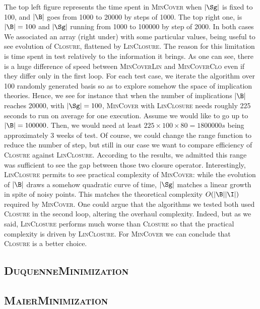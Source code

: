 The top left figure represents the time spent in \textsc{MinCover} when $|\Sg|$ is fixed to 100, and $|\B|$ goes from 1000 to 20000 by steps of 1000. The top right one, is $|\B| = 100$ and $|\Sg|$ running from 1000 to 100000 by step of 2000. In both cases We associated an array (right under) with some particular values, being useful to see evolution of \textsc{Closure}, flattened by \textsc{LinClosure}. The reason for this limitation is time spent in test relatively to the information it brings. As one can see, there is a huge difference of speed between \textsc{MinCoverLin} and \textsc{MinCoverClo} even if they differ only in the first loop. For each test case, we iterate the algorithm over 100 randomly generated basis so as to explore somehow the space of implication theories. Hence, we see for instance that when the number of implications $|\B|$ reaches 20000, with $|\Sg| = 100$, \textsc{MinCover} with \textsc{LinClosure} needs roughly 225 seconds to run on average for one execution. Assume we would like to go up to $|\B| = 100000$. Then, we would need at least $225 \times 100 \times 80 = 1800000s$ being approximately 3 weeks of test. Of course, we could change the range function to reduce the number of step, but still in our case we want to compare efficiency of \textsc{Closure} against \textsc{LinClosure}. According to the results, we admitted this range was sufficient to see the gap between those two closure operator. Interestingly, \textsc{LinClosure} permits to see practical complexity of \textsc{MinCover}: while the evolution of $|\B|$ draws a somehow quadratic curve of time, $|\Sg|$ matches a linear growth in spite of noisy points. This matches the theoretical complexity $O(|\B||\I|)$ required by \textsc{MinCover}. One could argue that the algorithms we tested both used \textsc{Closure} in the
second loop, altering the overhaul complexity. Indeed, but as we said, \textsc{LinClosure} performs much worse than \textsc{Closure} so that the practical complexity is driven by \textsc{LinClosure}. For \textsc{MinCover}
we can conclude that \textsc{Closure} is a better choice.

\subsection{\textsc{DuquenneMinimization}}

\subsection{\textsc{MaierMinimization}}

